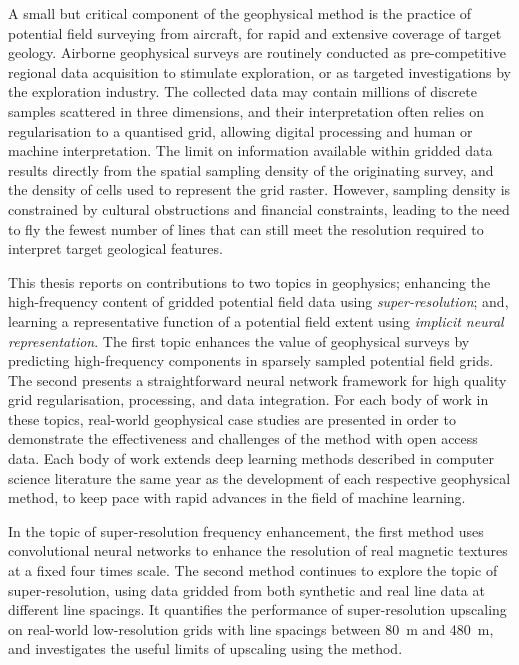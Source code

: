 \documentclass[12pt,a4paper]{report} %
\begin{document}
A small but critical component of the geophysical method is the practice of potential field surveying from aircraft, for rapid and extensive coverage of target geology.
Airborne geophysical surveys are routinely conducted as pre-competitive regional data acquisition to stimulate exploration, or as targeted investigations by the exploration industry.
The collected data may contain millions of discrete samples scattered in three dimensions, and their interpretation often relies on regularisation to a quantised grid, allowing digital processing and human or machine interpretation.
The limit on information available within gridded data results directly from the spatial sampling density of the originating survey, and the density of cells used to represent the grid raster.
However, sampling density is constrained by cultural obstructions and financial constraints, leading to the need to fly the fewest number of lines that can still meet the resolution required to interpret target geological features.

This thesis reports on contributions to two topics in geophysics; enhancing the high-frequency content of gridded potential field data using \emph{super-resolution}; and, learning a representative function of a potential field extent using \emph{implicit neural representation}.
The first topic enhances the value of geophysical surveys by predicting high-frequency components in sparsely sampled potential field grids.
The second presents a straightforward neural network framework for high quality grid regularisation, processing, and data integration.
For each body of work in these topics, real-world geophysical case studies are presented in order to demonstrate the effectiveness and challenges of the method with open access data.
Each body of work extends deep learning methods described in computer science literature the same year as the development of each respective geophysical method, to keep pace with rapid advances in the field of machine learning.

In the topic of super-resolution frequency enhancement, the first method uses convolutional neural networks to enhance the resolution of real magnetic textures at a fixed four times scale.
The second method continues to explore the topic of super-resolution, using data gridded from both synthetic and real line data at different line spacings.
It quantifies the performance of super-resolution upscaling on real-world low-resolution grids with line spacings between \SI{80}{\m} and \SI{480}{\m}, and investigates the useful limits of upscaling using the method.
\end{document}
